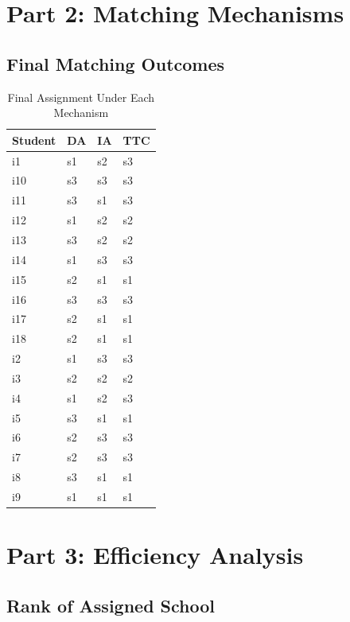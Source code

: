 \documentclass{article}
\begin{document}
\section*{Part 2: Matching Mechanisms}

\subsection*{Final Matching Outcomes}

\begin{table}[H]
\centering
\caption{Final Assignment Under Each Mechanism}
\begin{tabular}{llll}
\toprule
Student & DA & IA & TTC \\
\midrule
i1 & s1 & s2 & s3 \\
i10 & s3 & s3 & s3 \\
i11 & s3 & s1 & s3 \\
i12 & s1 & s2 & s2 \\
i13 & s3 & s2 & s2 \\
i14 & s1 & s3 & s3 \\
i15 & s2 & s1 & s1 \\
i16 & s3 & s3 & s3 \\
i17 & s2 & s1 & s1 \\
i18 & s2 & s1 & s1 \\
i2 & s1 & s3 & s3 \\
i3 & s2 & s2 & s2 \\
i4 & s1 & s2 & s3 \\
i5 & s3 & s1 & s1 \\
i6 & s2 & s3 & s3 \\
i7 & s2 & s3 & s3 \\
i8 & s3 & s1 & s1 \\
i9 & s1 & s1 & s1 \\
\bottomrule
\end{tabular}
\end{table}

\section*{Part 3: Efficiency Analysis}

\subsection*{Rank of Assigned School}
\end{document}
